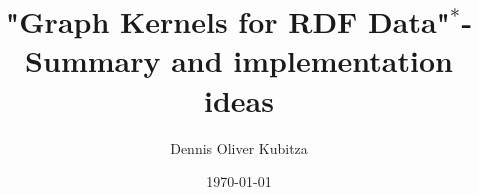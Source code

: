 \usepackage[ngerman]{babel}\usepackage[babel=true]{microtype}
\usepackage[utf8]{inputenc}%
\usepackage[T1]{fontenc}\usepackage{lmodern}\usepackage{url}\usepackage{color}\usepackage{tikz}\usetikzlibrary{shadows,arrows,shapes,calc}
\usepackage{amsmath,amssymb,amsfonts,amsthm,amsbsy}%
\usepackage{graphicx} %
\usepackage{placeins} %
\usepackage{setspace}
\usepackage{comment}
\usepackage{hyperref}
\usepackage{listings}
\usepackage{caption}
\usepackage{multicol}
\usepackage{xcolor}
\usepackage{smartdiagram}
\usepackage{dcolumn}%

\title{"Graph Kernels for RDF Data"$^\text{*}$- Summary and implementation ideas}
\author{Dennis Oliver Kubitza}
\date{\today}




\newcommand*\keystroke[1]{\tikz[baseline=(key.base)]\node[draw, fill=white, drop shadow={shadow xshift=0.25ex,shadow yshift=-0.25ex,fill=black,opacity=0.75}, rectangle, rounded corners=2pt, inner sep=1pt, line width=0.5pt, font=\scriptsize\sffamily ](key) {#1\strut};}
\newsavebox{\codebox}%


